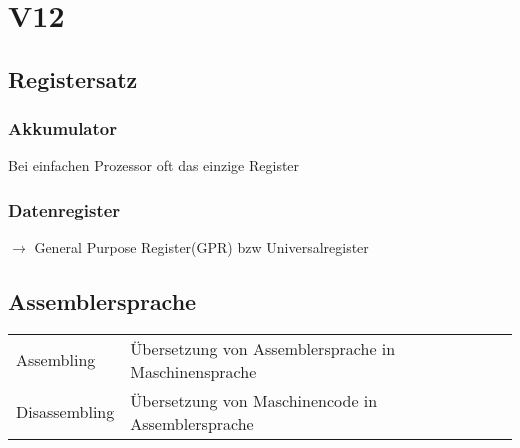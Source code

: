 \section{V12}
\subsection{Registersatz}
\subsubsection{Akkumulator}
Bei einfachen Prozessor oft das einzige Register
\subsubsection{Datenregister}
$ \rightarrow $ General Purpose Register(GPR) bzw Universalregister
\subsection{Assemblersprache}
\begin{tabular}{ll}
    Assembling& Übersetzung von Assemblersprache in Maschinensprache \\  
    Disassembling& Übersetzung von Maschinencode in Assemblersprache \\ 
\end{tabular} 
